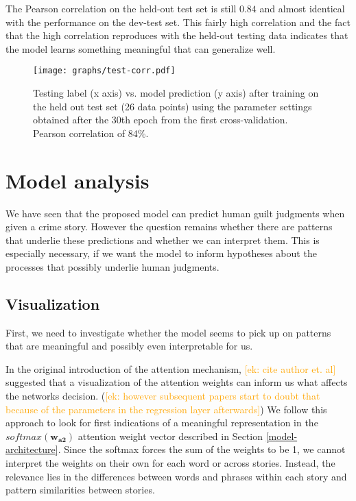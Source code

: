 \documentclass[11pt,a4paper]{article}
\newcommand{\ek}[1]{\textcolor{Orange}{[ek: #1]}}
\begin{document}
The Pearson correlation on the held-out test set is still $0.84$ and almost identical with the performance on the dev-test set. This fairly high correlation and the fact that the high correlation reproduces with the held-out testing data indicates that the model learns something meaningful that can generalize well.

\begin{figure}
	\texttt{[image: graphs/test-corr.pdf]}
	\caption{Testing label (x axis) vs. model prediction (y axis) after training on the held out test set (26 data points) using the parameter settings obtained after the 30th epoch from the first cross-validation. Pearson correlation of 84\%.}
	\label{fig:test-corr}
\end{figure}

\section{Model analysis}

We have seen that the proposed model can predict human guilt judgments when given a crime story. However the question remains whether there are patterns that underlie these predictions and whether we can interpret them. This is especially necessary, if we want the model to inform hypotheses about the processes that possibly underlie human judgments.

\subsection{Visualization}

First, we need to investigate whether the model seems to pick up on patterns that are meaningful and possibly even interpretable for us.

In the original introduction of the attention mechanism, \ek{cite author et. al} suggested that a visualization of the attention weights can inform us what affects the networks decision. (\ek{ however subsequent papers start to doubt that because of the parameters in the regression layer afterwards}) We follow this approach to look for first indications of a meaningful representation in the $softmax(\mathbf{w_{a2}})$ attention weight vector described in Section \ref{model-architecture}. Since the softmax forces the sum of the weights to be 1, we cannot interpret the weights on their own for each word or across stories. Instead, the relevance lies in the differences between words and phrases within each story and pattern similarities between stories.
\end{document}

